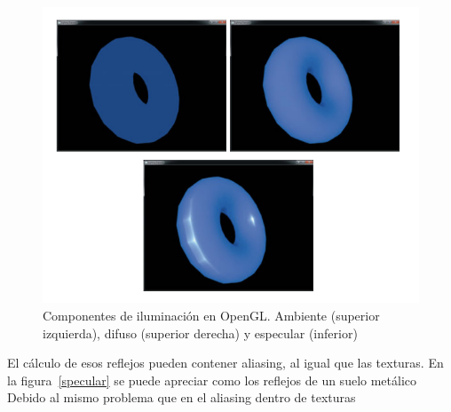 \documentclass[withindex, glossary]{cam-thesis}
\begin{document}
\begin{figure}[!htbp]
    \centering
    \includegraphics[width=.8\linewidth]{figures/iluminacion.png}
    \caption{Componentes de iluminación en OpenGL\@. Ambiente (superior izquierda), difuso (superior derecha) y especular (inferior)\cite{Shreiner:2013:OPG:2544032}}
    \label{gls}
\end{figure}

El cálculo de esos reflejos pueden contener aliasing, al igual que las texturas. En la figura~\ref{specular} se puede apreciar como los reflejos de un suelo metálico
Debido al mismo problema que en el aliasing dentro de texturas
\end{document}
